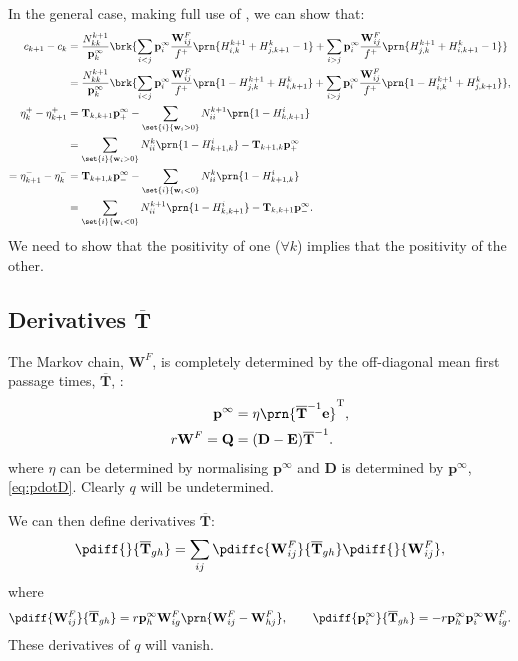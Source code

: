 \documentclass[12pt]{article}
\newcommand{\inv}{^{-1}}
\newcommand{\trans}{^\mathrm{T}}
\newcommand{\onev}{\mathbf{e}}
\newcommand{\onem}{\mathbf{E}}
\newcommand{\MM}{\mathbf{Q}}
\newcommand{\eq}{\mathbf{p}^\infty}
\newcommand{\fpt}{\mathbf{T}}
\newcommand{\fptb}{\overline{\fpt}}
\newcommand{\D}{\mathbf{D}}
\newcommand{\w}{\mathbf{w}}
\newcommand{\W}{\mathbf{W}}
\begin{document}
In the general case, making full use of \cite[Cor.6.2.7]{kemeny1960finite}, we can show that:
%
\begin{equation}\label{eq:areacoeffdiff}
  \begin{aligned}
    c_{k+1} - c_k &= \frac{N^{k+1}_{kk}}{\eq_k} \brk{
      \sum_{i<j} \eq_i \frac{\W^F_{ij}}{f^+} \prn{H^{k+1}_{i,k} + H^{k}_{j,k+1} - 1}
      +\sum_{i>j} \eq_i \frac{\W^F_{ij}}{f^+} \prn{H^{k+1}_{j,k} + H^{k}_{i,k+1} - 1}
    } \\
    &= \frac{N^{k+1}_{kk}}{\eq_k} \brk{
      \sum_{i<j} \eq_i \frac{\W^F_{ij}}{f^+} \prn{1 - H^{k+1}_{j,k} + H^{k}_{i,k+1}}
      +\sum_{i>j} \eq_i \frac{\W^F_{ij}}{f^+} \prn{1 - H^{k+1}_{i,k} + H^{k}_{j,k+1}}
    }, \\
    \eta^+_{k} - \eta^+_{k+1} &=
      \fpt_{k,k+1} \eq_+ - \sum_{\set{i}{\w_i>0}} N^{k+1}_{ii} \prn{1 - H^{i}_{k,k+1}} \\&=
      \sum_{\set{i}{\w_i>0}} N^{k}_{ii} \prn{1 - H^{i}_{k+1,k}} - \fpt_{k+1,k} \eq_+ \\
    = \eta^-_{k+1} - \eta^-_{k} &=
      \fpt_{k+1,k} \eq_- - \sum_{\set{i}{\w_i<0}} N^{k}_{ii} \prn{1 - H^{i}_{k+1,k}} \\&=
      \sum_{\set{i}{\w_i<0}} N^{k+1}_{ii} \prn{1 - H^{i}_{k,k+1}} - \fpt_{k,k+1} \eq_- .
  \end{aligned}
\end{equation}
%
We need to show that the positivity of one ($\forall k$) implies that the positivity of the other.



\subsection{Derivatives \wrt \texorpdfstring{$\fptb$}{T}}\label{sec:derivT}

The Markov chain, $\W^F$, is completely determined by the off-diagonal mean first passage times, $\fptb$, \cite[Th.4.4.12]{kemeny1960finite}:
%
\begin{equation}\label{eq:fptdet}
  \begin{aligned}
    \eq &= \eta \prn{\fptb\inv\onev}\trans, \\
    r\W^F= \MM &= (\D-\onem)\fptb\inv.
  \end{aligned}
\end{equation}
%
where $\eta$ can be determined by normalising $\eq$ and $\D$ is determined by $\eq$, \eqref{eq:pdotD}. Clearly $q$ will be undetermined.

We can then define derivatives \wrt $\fptb$:
%
\begin{equation}\label{eq:derivTdef}
  \pdiff{}{\fptb_{gh}} = \sum_{ij} \pdiffc{\W^F_{ij}}{\fptb_{gh}} \pdiff{}{\W^F_{ij}},
\end{equation}
%
where
%
\begin{equation}\label{eq:derivTWp}
  \pdiff{\W^F_{ij}}{\fptb_{gh}} = r \eq_h \W^F_{ig} \prn{\W^F_{ij}-\W^F_{hj}} ,
  \qquad
  \pdiff{\eq_{i}}{\fptb_{gh}} = -r \eq_h \eq_i \W^F_{ig} .
\end{equation}
%
These derivatives of $q$ will vanish.
\end{document}
